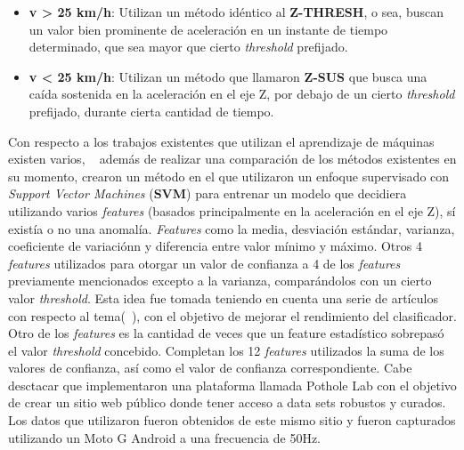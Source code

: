 \begin{itemize}
	\item \textbf {v > 25 km/h}:  Utilizan un método idéntico al \textbf {Z-THRESH}, o sea, buscan un valor bien prominente de
		aceleración en un instante de tiempo determinado, que sea mayor que cierto \emph{threshold} prefijado.\\
	\item \textbf {v < 25 km/h}:  Utilizan un método que llamaron \textbf {Z-SUS} que busca una caída sostenida en la aceleración
		en el eje Z, por debajo de un cierto \emph{threshold} prefijado, durante cierta cantidad de tiempo.\\
\end{itemize}

Con respecto a los trabajos existentes que utilizan el aprendizaje de máquinas existen varios, ~\parencite{carlos2018evaluation} además de realizar
una comparación de los métodos existentes en su momento, crearon un método en el que utilizaron un enfoque supervisado con \emph{Support Vector Machines} 
(\textbf{SVM}) para entrenar un modelo que decidiera utilizando varios \emph{features} (basados principalmente en la aceleración en el eje Z), sí existía
o no una anomalía. \emph{Features} como la media, desviación estándar, varianza, coeficiente de variaciónn y diferencia entre valor mínimo y máximo. Otros
4 \emph{features} utilizados para otorgar un valor de confianza a 4 de los \emph{features} previamente mencionados excepto a la varianza, comparándolos con
un cierto valor \emph{threshold}. Esta idea fue tomada teniendo en cuenta una serie de artículos con respecto al tema(~\parencite{mednis2011real}), con el
objetivo de mejorar el rendimiento del clasificador. Otro de los \emph{features} es la cantidad de veces que un feature estadístico sobrepasó el valor
\emph{threshold} concebido. Completan los 12 \emph{features} utilizados la suma de los valores de confianza, así como el valor de confianza correspondiente.
Cabe desctacar que implementaron una plataforma llamada Pothole Lab con el objetivo de crear un sitio web público donde tener acceso a data sets robustos y
curados. Los datos que utilizaron fueron obtenidos de este mismo sitio y fueron capturados utilizando un Moto G Android a una frecuencia de 50Hz.\\

